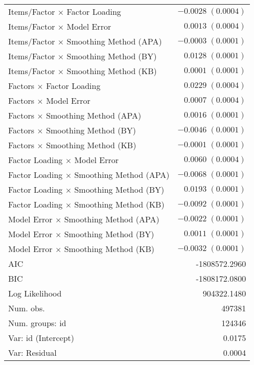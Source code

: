 \documentclass[
  english,
  man]{apa6}
\begin{document}
\begin{center}
\begin{longtable}{l r }
Items/Factor $\times$ Factor Loading           & $-0.0028 \; (0.0004)$ \\
Items/Factor $\times$ Model Error              & $0.0013 \; (0.0004)$  \\
Items/Factor $\times$ Smoothing Method (APA)   & $-0.0003 \; (0.0001)$ \\
Items/Factor $\times$ Smoothing Method (BY)    & $0.0128 \; (0.0001)$  \\
Items/Factor $\times$ Smoothing Method (KB)    & $0.0001 \; (0.0001)$  \\
Factors $\times$ Factor Loading                & $0.0229 \; (0.0004)$  \\
Factors $\times$ Model Error                   & $0.0007 \; (0.0004)$  \\
Factors $\times$ Smoothing Method (APA)        & $0.0016 \; (0.0001)$  \\
Factors $\times$ Smoothing Method (BY)         & $-0.0046 \; (0.0001)$ \\
Factors $\times$ Smoothing Method (KB)         & $-0.0001 \; (0.0001)$ \\
Factor Loading $\times$ Model Error            & $0.0060 \; (0.0004)$  \\
Factor Loading $\times$ Smoothing Method (APA) & $-0.0068 \; (0.0001)$ \\
Factor Loading $\times$ Smoothing Method (BY)  & $0.0193 \; (0.0001)$  \\
Factor Loading $\times$ Smoothing Method (KB)  & $-0.0092 \; (0.0001)$ \\
Model Error $\times$ Smoothing Method (APA)    & $-0.0022 \; (0.0001)$ \\
Model Error $\times$ Smoothing Method (BY)     & $0.0011 \; (0.0001)$  \\
Model Error $\times$ Smoothing Method (KB)     & $-0.0032 \; (0.0001)$ \\
\hline
AIC                                            & -1808572.2960         \\
BIC                                            & -1808172.0800         \\
Log Likelihood                                 & 904322.1480           \\
Num. obs.                                      & 497381                \\
Num. groups: id                                & 124346                \\
Var: id (Intercept)                            & 0.0175                \\
Var: Residual                                  & 0.0004                \\
\end{longtable}
\end{center}
\end{document}
